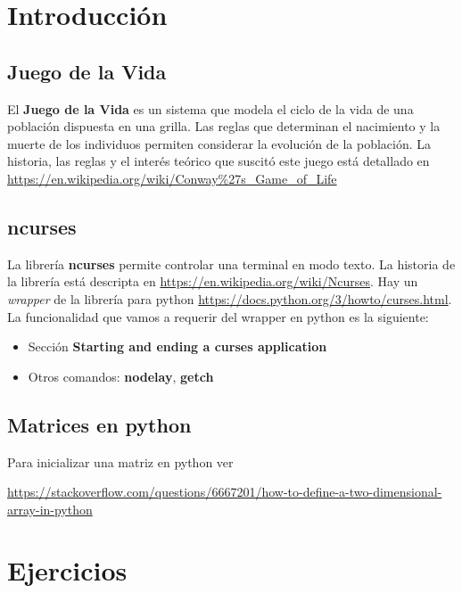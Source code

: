 \documentclass[a4paper]{article}
\begin{document}

\section{Introducción}

\subsection{Juego de la Vida}

El \textbf{Juego de la Vida} es un sistema que modela el ciclo de la vida 
de una población dispuesta en una grilla. Las reglas que 
determinan el nacimiento y la muerte de los individuos permiten 
considerar la evolución de la población. La historia, las reglas y el 
interés teórico que suscitó este juego  está detallado en \url{https://en.wikipedia.org/wiki/Conway%27s_Game_of_Life}

\subsection{ncurses}

La librería \textbf{ncurses} permite controlar una terminal en modo 
texto. La historia de la librería está descripta en 
\url{https://en.wikipedia.org/wiki/Ncurses}. Hay un \emph{wrapper} de 
la librería para python 
\url{https://docs.python.org/3/howto/curses.html}. La funcionalidad que 
vamos a requerir del wrapper en python es la siguiente:

\begin{itemize}
	\item Sección \textbf{Starting and ending a curses application}
	\item Otros comandos: \textbf{nodelay}, \textbf{getch}
\end{itemize}

\subsection{Matrices en python}

Para inicializar una matriz en python ver

\smallskip

\url{https://stackoverflow.com/questions/6667201/how-to-define-a-two-dimensional-array-in-python}

\section{Ejercicios}
\end{document}
